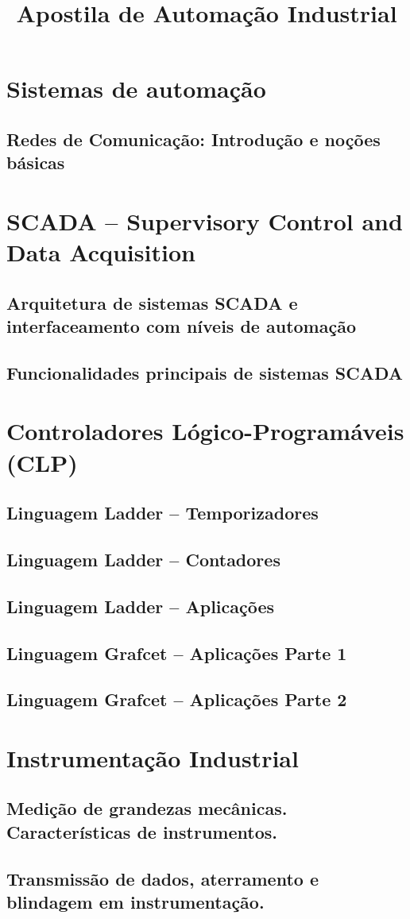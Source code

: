 \documentclass[12pt,oneside]{report}
\title{Apostila de Automação Industrial}
\begin{document}
\maketitle
\tableofcontents
\chapter{Sistemas de automação}


\section{Redes de Comunicação: Introdução e noções básicas}
\chapter{SCADA -- Supervisory Control and Data Acquisition}
\section{Arquitetura de sistemas SCADA e interfaceamento com níveis de automação}
\section{Funcionalidades principais de sistemas SCADA}
\chapter{Controladores Lógico-Programáveis (CLP)}


\section{Linguagem Ladder – Temporizadores}
\section{Linguagem Ladder – Contadores}
\section{Linguagem Ladder – Aplicações}

\section{Linguagem Grafcet – Aplicações Parte 1}
\section{Linguagem Grafcet – Aplicações Parte 2}
\chapter{Instrumentação Industrial}
\section{Medição de grandezas mecânicas. Características de instrumentos.}
\section{Transmissão de dados, aterramento e blindagem em instrumentação.}
\end{document}

